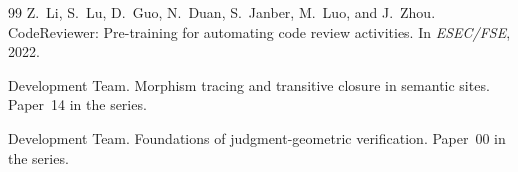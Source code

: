 \documentclass[11pt]{article}
\begin{document}
\begin{thebibliography}{99}
Z.~Li, S.~Lu, D.~Guo, N.~Duan, S.~Janber, M.~Luo, and J.~Zhou.
\newblock Code{R}eviewer: Pre-training for automating code review activities.
\newblock In \emph{ESEC/FSE}, 2022.

\JuGeo{} Development Team.
\newblock Morphism tracing and transitive closure in semantic sites.
\newblock Paper~14 in the \JuGeo{} series.

\JuGeo{} Development Team.
\newblock Foundations of judgment-geometric verification.
\newblock Paper~00 in the \JuGeo{} series.
\end{thebibliography}
\end{document}
